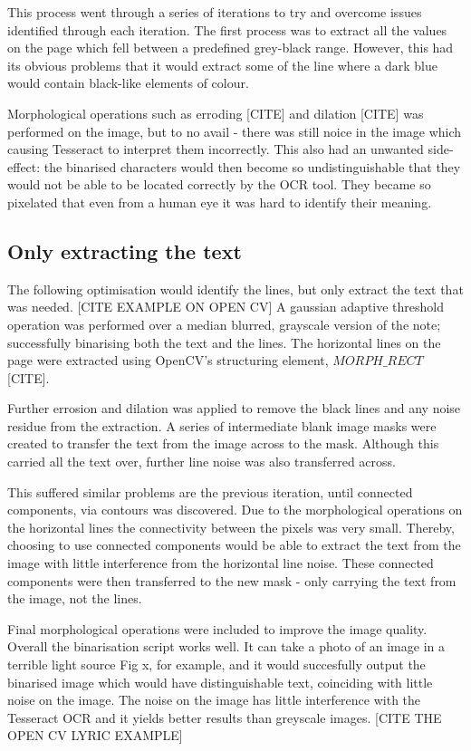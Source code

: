 This process went through a series of iterations to try and overcome issues identified through each iteration. The first process was to extract all the values on the page which fell between a predefined grey-black range. However, this had its obvious problems that it would extract some of the line where a dark blue would contain black-like elements of colour.

Morphological operations such as erroding [CITE] and dilation [CITE] was performed on the image, but to no avail - there was still noice in the image which causing Tesseract to interpret them incorrectly. This also had an unwanted side-effect: the binarised characters would then become so undistinguishable that they would not be able to be located correctly by the OCR tool. They became so pixelated that even from a human eye it was hard to identify their meaning.

\subsection{Only extracting the text}
The following optimisation would identify the lines, but only extract the text that was needed.
[CITE EXAMPLE ON OPEN CV]
A gaussian adaptive threshold operation was performed over a median blurred, grayscale version of the note; successfully binarising both the text and the lines. The horizontal lines on the page were extracted using OpenCV's structuring element, $MORPH\_RECT$ [CITE].

Further errosion and dilation was applied to remove the black lines and any noise residue from the extraction. A series of intermediate blank image masks were created to transfer the text from the image across to the mask. Although this carried all the text over, further line noise was also transferred across.

This suffered similar problems are the previous iteration, until connected components, via contours was discovered. Due to the morphological operations on the horizontal lines the connectivity between the pixels was very small. Thereby, choosing to use connected components would be able to extract the text from the image with little interference from the horizontal line noise. These connected components were then transferred to the new mask - only carrying the text from the image, not the lines.

Final morphological operations were included to improve the image quality. Overall the binarisation script works well.  It can take a photo of an image in a terrible light source Fig x, for example, and it would succesfully output the binarised image which would have distinguishable text, coinciding with little noise on the image. The noise on the image has little interference with the Tesseract OCR and it yields better results than greyscale images.
[CITE THE OPEN CV LYRIC EXAMPLE]
